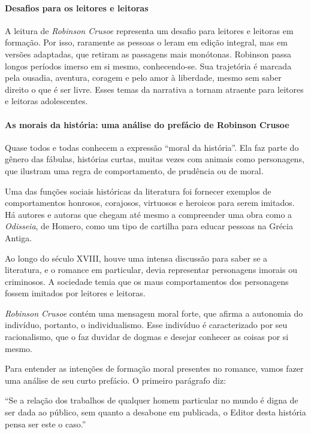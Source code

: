 \documentclass{article}
\begin{document}
\paragraph{Desafios para os leitores e leitoras}
A leitura de \emph{Robinson Crusoe} representa um desafio para leitores
e leitoras em formação. Por isso, raramente as pessoas o leram em edição
integral, mas em versões adaptadas, que retiram as passagens mais
monótonas. Robinson passa longos períodos imerso em si mesmo,
conhecendo-se. Sua trajetória é marcada pela ousadia, aventura, coragem
e pelo amor à liberdade, mesmo sem saber direito o que é ser livre.
Esses temas da narrativa a tornam atraente para leitores e leitoras
adolescentes.

\paragraph{As morais da história: uma análise do prefácio de Robinson Crusoe}
Quase todos e todas conhecem a expressão ``moral da história''. Ela faz
parte do gênero das fábulas, histórias curtas, muitas vezes com animais
como personagens, que ilustram uma regra de comportamento, de prudência
ou de moral.

Uma das funções sociais históricas da literatura foi fornecer exemplos
de comportamentos honrosos, corajosos, virtuosos e heroicos para serem
imitados. Há autores e autoras que chegam até mesmo a compreender uma
obra como a \emph{Odisseia}, de Homero, como um tipo de cartilha para
educar pessoas na Grécia Antiga.

Ao longo do século XVIII, houve uma intensa discussão para saber se a
literatura, e o romance em particular, devia representar personagens
imorais ou criminosos. A sociedade temia que os maus comportamentos dos
personagens fossem imitados por leitores e leitoras.

\emph{Robinson Crusoe} contém uma mensagem moral forte, que afirma a
autonomia do indivíduo, portanto, o individualismo. Esse indivíduo é
caracterizado por seu racionalismo, que o faz duvidar de dogmas e
desejar conhecer as coisas por si mesmo.

Para entender as intenções de formação moral presentes no romance, vamos
fazer uma análise de seu curto prefácio. O primeiro parágrafo diz:

``Se a relação dos trabalhos de qualquer homem particular no mundo é
digna de ser dada ao público, sem quanto a desabone em publicada, o
Editor desta história pensa ser este o caso.''
\end{document}
